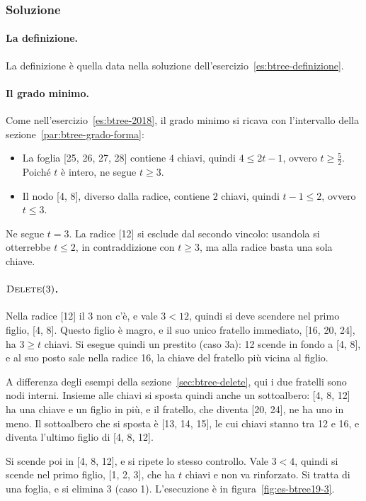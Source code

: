 \subsubsection*{Soluzione}

\paragraph{La definizione.}
La definizione è quella data nella soluzione dell'esercizio~\ref{es:btree-definizione}.

\paragraph{Il grado minimo.}
Come nell'esercizio~\ref{es:btree-2018}, il grado minimo si ricava con l'intervallo della sezione~\ref{par:btree-grado-forma}:
\begin{itemize}
    \item La foglia [25, 26, 27, 28] contiene $4$ chiavi, quindi $4 \le 2t-1$, ovvero $t \ge \frac{5}{2}$. Poiché $t$ è intero, ne segue $t \ge 3$.
    \item Il nodo [4, 8], diverso dalla radice, contiene $2$ chiavi, quindi $t-1 \le 2$, ovvero $t \le 3$.
\end{itemize}

Ne segue $t = 3$. La radice [12] si esclude dal secondo vincolo: usandola si otterrebbe $t \le 2$, in contraddizione con $t \ge 3$, ma alla radice basta una sola chiave.

\paragraph{$\textsc{Delete}(3)$.}
Nella radice [12] il 3 non c'è, e vale $3 < 12$, quindi si deve scendere nel primo figlio, [4, 8]. Questo figlio è magro, e il suo unico fratello immediato, [16, 20, 24], ha $3 \ge t$ chiavi. Si esegue quindi un prestito (caso 3a): 12 scende in fondo a [4, 8], e al suo posto sale nella radice 16, la chiave del fratello più vicina al figlio.

A differenza degli esempi della sezione~\ref{sec:btree-delete}, qui i due fratelli sono nodi interni. Insieme alle chiavi si sposta quindi anche un sottoalbero: [4, 8, 12] ha una chiave e un figlio in più, e il fratello, che diventa [20, 24], ne ha uno in meno. Il sottoalbero che si sposta è [13, 14, 15], le cui chiavi stanno tra 12 e 16, e diventa l'ultimo figlio di [4, 8, 12].

Si scende poi in [4, 8, 12], e si ripete lo stesso controllo. Vale $3 < 4$, quindi si scende nel primo figlio, [1, 2, 3], che ha $t$ chiavi e non va rinforzato. Si tratta di una foglia, e si elimina 3 (caso 1). L'esecuzione è in figura~\ref{fig:es-btree19-3}.

